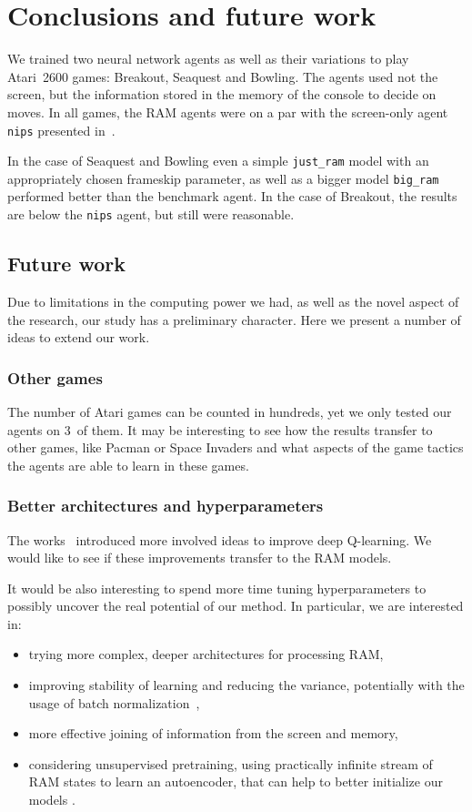 \chapter{Conclusions and future work}\label{conclusions}
We trained two neural network agents as well as their variations to play Atari~2600 games: Breakout, Seaquest and Bowling. The agents used not the screen, but the information stored in the memory of the console to decide on moves. In all games, the RAM agents were on a par with the screen-only agent \texttt{nips} presented in~\cite{nips-dqn}.

In the case of Seaquest and Bowling even a simple \texttt{just\_ram} model with an appropriately chosen frameskip parameter, as well as a bigger model \texttt{big\_ram} performed better than the benchmark agent. In the case of Breakout, the results are below the \texttt{nips} agent, but still were reasonable.

\section{Future work}
Due to limitations in the computing power we had, as well as the novel aspect of the research, our study has a preliminary character. Here we present a number of ideas to extend our work.

\subsection{Other games}
The number of Atari games can be counted in hundreds, yet we only tested our agents on $3$~of them. It may be interesting to see how the results transfer to other games, like Pacman or Space Invaders and what aspects of the game tactics the agents are able to learn in these games.

\subsection{Better architectures and hyperparameters}
The works~\cite{nature-dqn, double-dqn, shallow-dqn, duelling-dqn} introduced more 
involved ideas to improve deep Q-learning. We would like to see if these improvements transfer to the RAM models.

It would be also interesting to spend more time tuning hyperparameters to possibly uncover the real potential of our method. In particular, we are interested in:
\begin{itemize}
  \item trying more complex, deeper architectures for processing RAM,
  \item improving stability of learning and reducing the variance, potentially with the usage of batch normalization~\cite{batchnorm},
  \item more effective joining of information from the screen and memory,
  \item considering unsupervised pretraining, using practically infinite stream of RAM states to learn an autoencoder, that can help to better initialize our models \cite{autoencoders}.
\end{itemize}

